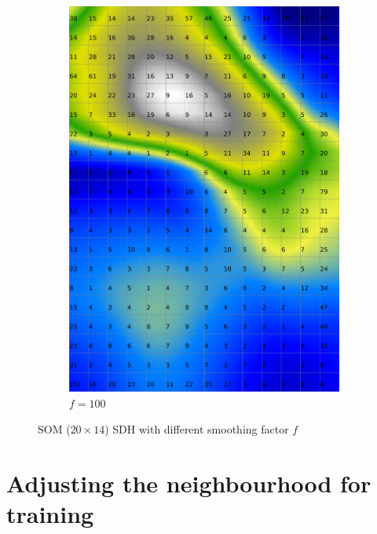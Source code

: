 \documentclass{acm_proc_article-sp}
\begin{document}
\begin{figure}
\begin{subfigure}[b]{0.30\linewidth}
        \includegraphics[width=\linewidth]{img/wine-weird-smoothed-data-histogram-100}
        \caption{$f=100$}
    \end{subfigure}
    \caption{SOM ($20\times14$) SDH with different smoothing factor $f$}
    \label{fig:wine-weird-smoothed-data-histogram-series}
\end{figure}

\section{Adjusting the neighbourhood for training}




\end{document}

